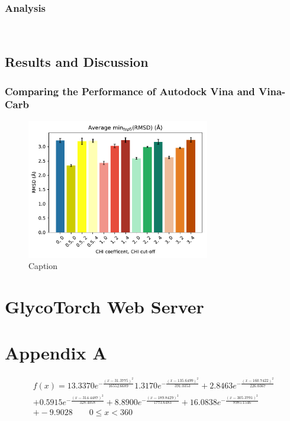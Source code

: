\documentclass[a4paper, 12pt, openany]{book}
\begin{document}
\subsection{Analysis}\\

\section{Results and Discussion}

\subsection{Comparing the Performance of Autodock Vina and Vina-Carb}


\begin{figure}
    \centering
    \includegraphics[width=8cm]{Figures/Docking/chairs_RMSD.pdf}
    \caption{Caption}
    \label{fig:my_label}
\end{figure}

\chapter{GlycoTorch Web Server}



\newpage
{}
\printbibliography

\newpage
\chapter{Appendix A}
\vspace{1cm}

\begin{multline}
f(x) = 13.3370e^{-\frac{(x-31.3775)^{2} } { 16552.6689 } }
1.3170e^{-\frac{(x-135.6499)^{2} } { 391.0353 } } +
2.8463e^{-\frac{(x-160.7422)^{2} } { 226.0367 } } \\ +
0.5915e^{-\frac{(x-314.4487)^{2} } { 328.4058 } }  +
8.8900e^{-\frac{(x-189.8429)^{2} } { 1773.6483 } } +
16.0838e^{-\frac{(x-305.3791)^{2} } { 8985.1546 } } \\ + -9.9028
\quad \quad 0 \leq x < 360
\end{multline}

\end{document}
